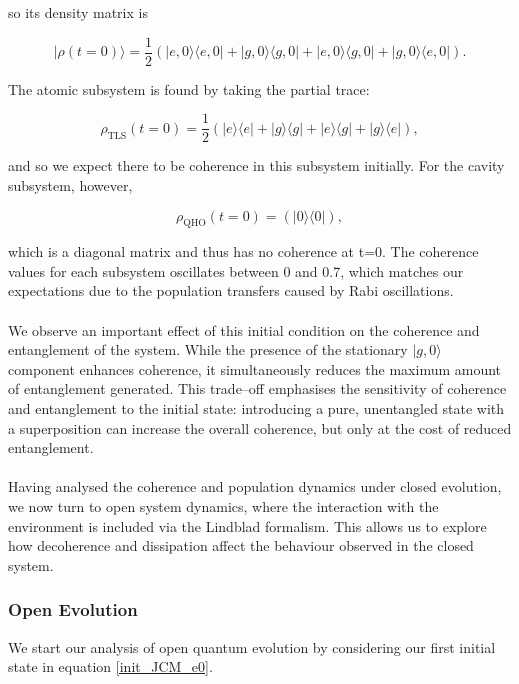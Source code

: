 \documentclass[11pt]{article}
\newcounter{subsubsubsection}[subsubsection]
\begin{document}
so its density matrix is

\begin{equation*}
    |\rho(t=0)\rangle = \frac{1}{2}\left(|e,0\rangle\langle e,0| + |g,0\rangle\langle g,0| + |e,0\rangle\langle g,0| + |g,0\rangle\langle e,0| \right).
\end{equation*}

The atomic subsystem is found by taking the partial trace:

\begin{equation*}
    \rho_{\scriptscriptstyle \text{TLS}}(t = 0) = \frac{1}{2}\left(|e\rangle\langle e|+ |g\rangle\langle g|+|e\rangle\langle g|+|g\rangle\langle e|\right),
\end{equation*}

and so we expect there to be coherence in this subsystem initially. For the cavity subsystem, however, 

\begin{equation*}
    \rho_{\scriptscriptstyle \text{QHO}}(t = 0) = \left(|0\rangle\langle 0|\right),
\end{equation*}

which is a diagonal matrix and thus has no coherence at t=0. The coherence values for each subsystem oscillates between 0 and 0.7, which matches our expectations due to the population transfers caused by Rabi oscillations.\\
\\
We observe an important effect of this initial condition on the coherence and entanglement of the system. While the presence of the stationary $|g,0\rangle$ component enhances coherence, it simultaneously reduces the maximum amount of entanglement generated. This trade--off emphasises the sensitivity of coherence and entanglement to the initial state: introducing a pure, unentangled state with a superposition can increase the overall coherence, but only at the cost of reduced entanglement.\\
\\
Having analysed the coherence and population dynamics under closed evolution, we now turn to open system dynamics, where the interaction with the environment is included via the Lindblad formalism. This allows us to explore how decoherence and dissipation affect the behaviour observed in the closed system.

\subsubsection{Open Evolution}
We start our analysis of open quantum evolution by considering our first initial state in equation \eqref{init_JCM_e0}.
\end{document}
